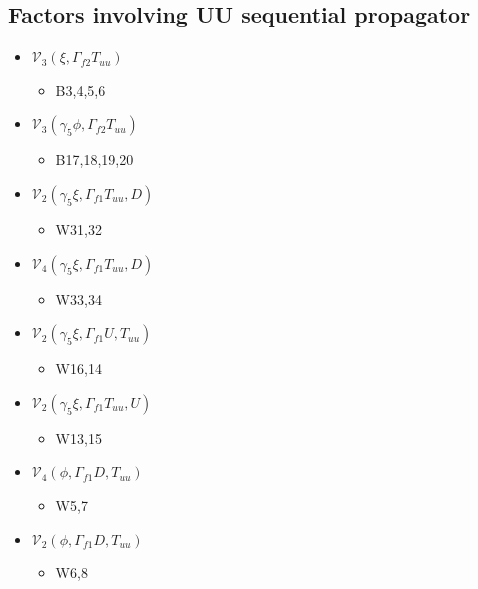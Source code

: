 \documentclass{article}[12pt]
\begin{document}
\subsection{Factors involving UU sequential propagator}
\begin{itemize}
\item ${\mathcal V}_3\left(\xi, \Gamma_{f2} T_{uu}\right)$
\begin{itemize}
\item B3,4,5,6
\end{itemize}
\item ${\mathcal V}_3\left(\gamma_5\phi, \Gamma_{f2} T_{uu}\right)$
\begin{itemize}
\item B17,18,19,20
\end{itemize}
\item ${\mathcal V}_2\left(\gamma_5\xi, \Gamma_{f1} T_{uu}, D\right)$
\begin{itemize}
\item W31,32
\end{itemize}
\item ${\mathcal V}_4\left(\gamma_5\xi, \Gamma_{f1} T_{uu}, D\right)$
\begin{itemize}
\item W33,34
\end{itemize}
\item ${\mathcal V}_2\left(\gamma_5\xi, \Gamma_{f1} U, T_{uu} \right)$
\begin{itemize}
\item W16,14
\end{itemize}
\item ${\mathcal V}_2\left(\gamma_5\xi, \Gamma_{f1} T_{uu}, U\right)$
\begin{itemize}
\item W13,15
\end{itemize}
\item ${\mathcal V}_4\left(\phi, \Gamma_{f1}D,  T_{uu}\right)$
\begin{itemize}
\item W5,7
\end{itemize}
\item ${\mathcal V}_2\left(\phi, \Gamma_{f1}D,  T_{uu}\right)$
\begin{itemize}
\item W6,8
\end{itemize}
\end{itemize}
\end{document}
